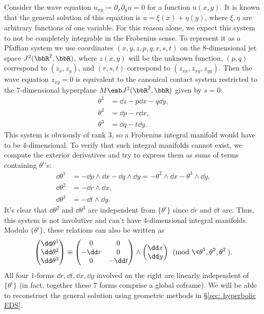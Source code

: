 \begin{example}
    Consider the wave equation $u_{xy}\coloneqq \partial_x\partial_yu=0$ for a function $u(x,y)$. It is known that the general solution of this equation is $u=\xi(x)+\eta(y)$, where $\xi,\eta$ are arbitrary functions of one variable. For this reason alone, we expect this system to not be completely integrable in the Frobenius sense. To represent it as a Pfaffian system we use coordinates $(x,y,z,p,q,r,s,t)$ on the $8$-dimensional jet space $J^2(\bbR^2,\bbR)$, where $z(x,y)$ will be the unknown function, $(p,q)$ correspond to $(z_x,z_y)$, and $(r,s,t)$ correspond to $(z_{xx},z_{xy},z_{yy})$. Then the wave equation $z_{xy}=0$ is equivalent to the canonical contact system restricted to the $7$-dimensional hyperplane $M\emb J^2(\bbR^2,\bbR)$ given by $s=0$:
    \begin{align}
        \theta^1&= \dd z-p\dd x-q\dd y,\\
        \theta^2&= \dd p- r\dd x,\\
        \theta^3&= \dd q- t\dd y.
    \end{align}
    This system is obviously of rank $3$, so a Frobenius integral manifold would have to be $4$-dimensional. To verify that such integral manifolds cannot exist, we compute the exterior derivatives and try to express them as sums of terms containing $\theta^i$'s:
    \begin{align}
        \dd\theta^1&=-\dd p\wedge \dd x-\dd q\wedge\dd y=-\theta^2\wedge\dd x-\theta^3\wedge \dd y,\\
        \dd\theta^2&=-\dd r\wedge\dd x,\\
        \dd\theta^3&=-\dd t\wedge \dd y.
    \end{align}
    It's clear that $\dd\theta^2$ and $\dd\theta^3$ are independent from $\{\theta^i\}$ since $\dd r$ and $\dd t$ are. Thus, this system is not involutive and can't have $4$-dimensional integral manifolds. Modulo $\{\theta^i\}$, these relations can also be written as 
    \[
        \begin{pmatrix}
            \dd\theta^1\\
            \dd\theta^2\\
            \dd\theta^3
        \end{pmatrix}\equiv
        \begin{pmatrix}
            0 & 0 \\
            -\dd r & 0\\
            0 & -\dd t
        \end{pmatrix}\wedge
        \begin{pmatrix}
            \dd x\\
            \dd y
        \end{pmatrix} \pmod{\<\theta^1,\theta^2,\theta^2\>}.
    \]
    All four $1$-forms $\dd r,\dd t,\dd x,\dd y$ involved on the right are linearly independent of $\{\theta^i\}$ (in fact, together these $7$ forms comprise a global coframe). We will be able to reconstruct the general solution using geometric methods in \S\ref{sec: hyperbolic EDS}.
\end{example}



